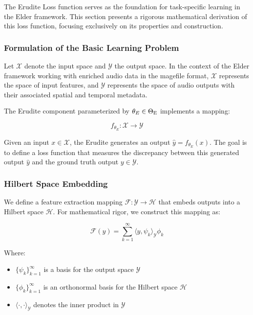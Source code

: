 The Erudite Loss function serves as the foundation for task-specific learning in the Elder framework. This section presents a rigorous mathematical derivation of this loss function, focusing exclusively on its properties and construction.

\subsubsection{Formulation of the Basic Learning Problem}

Let $\mathcal{X}$ denote the input space and $\mathcal{Y}$ the output space. In the context of the Elder framework working with enriched audio data in the magefile format, $\mathcal{X}$ represents the space of input features, and $\mathcal{Y}$ represents the space of audio outputs with their associated spatial and temporal metadata.

The Erudite component parameterized by $\theta_E \in \Theta_{\text{E}}$ implements a mapping:

\begin{equation}
f_{\theta_E}: \mathcal{X} \rightarrow \mathcal{Y}
\end{equation}

Given an input $x \in \mathcal{X}$, the Erudite generates an output $\hat{y} = f_{\theta_E}(x)$. The goal is to define a loss function that measures the discrepancy between this generated output $\hat{y}$ and the ground truth output $y \in \mathcal{Y}$.

\subsubsection{Hilbert Space Embedding}

We define a feature extraction mapping $\mathcal{F}: \mathcal{Y} \rightarrow \mathcal{H}$ that embeds outputs into a Hilbert space $\mathcal{H}$. For mathematical rigor, we construct this mapping as:

\begin{equation}
\mathcal{F}(y) = \sum_{k=1}^{\infty} \langle y, \psi_k \rangle_{\mathcal{Y}} \phi_k
\end{equation}

Where:
\begin{itemize}
\item $\{\psi_k\}_{k=1}^{\infty}$ is a basis for the output space $\mathcal{Y}$
\item $\{\phi_k\}_{k=1}^{\infty}$ is an orthonormal basis for the Hilbert space $\mathcal{H}$
\item $\langle \cdot, \cdot \rangle_{\mathcal{Y}}$ denotes the inner product in $\mathcal{Y}$
\end{itemize}

